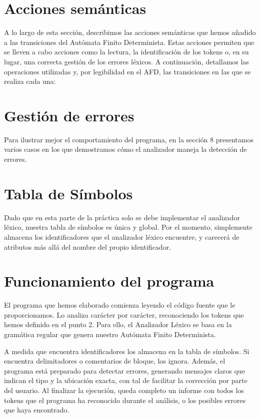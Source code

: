 \documentclass{article}
\begin{document}
\section{Acciones semánticas}
A lo largo de esta sección, describimos las acciones semánticas que hemos añadido a las transiciones del Autómata Finito Determinista. Estas acciones permiten que se lleven a cabo acciones como la lectura, la identificación de los tokens o, en su lugar, una correcta gestión de los errores léxicos. A continuación, detallamos las operaciones utilizadas y, por legibilidad en el AFD, las transiciones en las que se realiza cada una:\\


\section{Gestión de errores}


Para ilustrar mejor el comportamiento del programa, en la sección 8 presentamos varios casos en los que demostramos cómo el analizador maneja la detección de errores.

\section{Tabla de Símbolos}
Dado que en esta parte de la práctica solo se debe implementar el analizador léxico, nuestra tabla de símbolos es única y global. Por el momento, simplemente almacena los identificadores que el analizador léxico encuentre, y carecerá de atributos más allá del nombre del propio identificador.

\section{Funcionamiento del programa}
El programa que hemos elaborado comienza leyendo el código fuente que le proporcionamos. Lo analiza carácter por carácter, reconociendo los tokens que hemos definido en el punto 2. Para ello, el Analizador Léxico se basa en la gramática regular que genera nuestro Autómata Finito Determinista.

A medida que encuentra identificadores los almacena en la tabla de símbolos. Si encuentra delimitadores o comentarios de bloque, los ignora. Además, el programa está preparado para detectar errores, generando mensajes claros que indican el tipo y la ubicación exacta, con tal de facilitar la corrección por parte del usuario. Al finalizar la ejecución, queda completo un informe con todos los tokens que el programa ha reconocido durante el análisis, o los posibles errores que haya encontrado.
\end{document}
